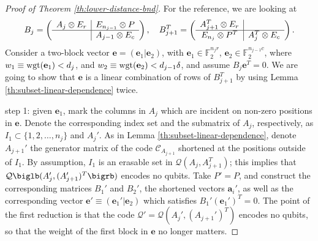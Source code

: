 \documentclass[aps,prb,12pt,tightenlines,%
notitlepage,longbibliography]{revtex4-1}
\begin{document}
\begin{proof}[Proof of Theorem \ref{th:lower-distance-bnd}]
  For the reference, we are looking at  
  $$
  B_j=\left(
    \begin{array}[c]{c|c}
      A_j\otimes E_r&E_{n_{j-1}}\otimes P\\ \hline 
                    & A_{j-1}\otimes E_c
    \end{array}\right),\quad 
  B_{j+1}^T=\left(
    \begin{array}[c]{c|c}
      A_{j+1}^T\otimes E_r& \\ \hline 
      E_{n_{j}}\otimes P^T        & A_{j}^T\otimes E_c
    \end{array}\right).
  $$
  Consider a two-block vector
  $\mathbf{e}=(\mathbf{e}_1|\mathbf{e}_2)$, with
  $\mathbf{e}_1\in\mathbb{F}_2^{n_j r}$,
  $\mathbf{e}_2\in\mathbb{F}_2^{n_{j-1} c}$, where
  $w_1\equiv \mathop{\rm wgt}(\mathbf{e}_1)<d_j$, and
  $w_2\equiv \mathop{\rm wgt}(\textbf{e}_2)<d_{j-1}\delta$, and assume
  $B_j \mathbf{e}^T=0$.  We are going to show that $\mathbf{e}$ is a
  linear combination of rows of $B_{j+1}^T$ by using Lemma
  \ref{th:subset-linear-dependence} twice.

  step 1: given $\mathbf{e}_1$, mark the columns in $A_j$ which are
  incident on non-zero positions in $\mathbf{e}$.  Denote the
  corresponding index set and the submatrix of $A_j$, respectively, as
  $I_1\subset\{1,2,\ldots,n_j\}$ and $A_j'$.  As in Lemma
  \ref{th:subset-linear-dependence}, denote $A_{j+1}'$ the generator
  matrix of the code $\mathcal{C}_{A_{j+1}}$ shortened at the
  positions outside of $I_1$.  By assumption, $I_1$ is an erasable set
  in $\mathcal{Q}(A_j,A_{j+1}^T)$; this implies that
  $\mathcal{Q}\biglb(A_j',(A_{j+1}')^T\bigrb)$ encodes no qubits.
  Take $P'=P$, and construct the corresponding matrices $B_1'$ and
  $B_2'$, the shortened vectors $\mathbf{a}_i'$, as well as the
  corresponding vector
  $\mathbf{e}'\equiv
  (\mathbf{e}_1'|\mathbf{e}_2)$ which satisfies
  $B_1'(\mathbf{e}_1')^T=0$. 
  The point of the first reduction is that the code
  $\mathcal{Q}'=\mathcal{Q}(A_j',(A_{j+1}')^T)$ encodes no qubits, so
  that the weight of the first block in $\mathbf{e}$ no longer
  matters.


\end{proof}
\end{document}
